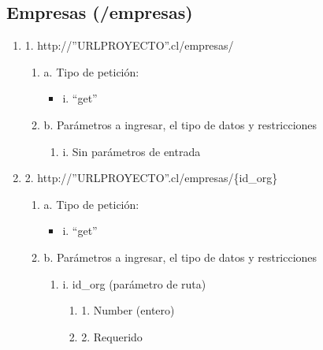 \subsection{Empresas (/empresas)}

\begin{enumerate}
    \item 1. http://”URLPROYECTO”.cl/empresas/
    \begin{enumerate}
        \item a. Tipo de petición:
            \begin{itemize}
               \item i. “get”
            \end{itemize}
        \item b. Parámetros a ingresar, el tipo de datos y restricciones
            \begin{enumerate}
                \item i. Sin parámetros de entrada
            \end{enumerate}
    \end{enumerate}

    \item 2. http://”URLPROYECTO”.cl/empresas/\{id\_org\}
    \begin{enumerate}
        \item a. Tipo de petición:
            \begin{itemize}
               \item i. “get”
            \end{itemize}
        \item b. Parámetros a ingresar, el tipo de datos y restricciones
            \begin{enumerate}
                \item i. id\_org (parámetro de ruta)
                    \begin{enumerate}
                        \item 1. Number (entero)
                        \item 2. Requerido
                    \end{enumerate}
            \end{enumerate}
    \end{enumerate}


\end{enumerate}
